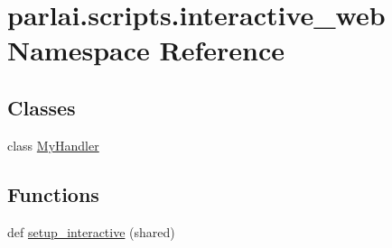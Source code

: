 \hypertarget{namespaceparlai_1_1scripts_1_1interactive__web}{}\section{parlai.\+scripts.\+interactive\+\_\+web Namespace Reference}
\label{namespaceparlai_1_1scripts_1_1interactive__web}
\subsection*{Classes}
\begin{DoxyCompactItemize}
\item 
class \hyperlink{classparlai_1_1scripts_1_1interactive__web_1_1MyHandler}{My\+Handler}
\end{DoxyCompactItemize}
\subsection*{Functions}
\begin{DoxyCompactItemize}
\item 
def \hyperlink{namespaceparlai_1_1scripts_1_1interactive__web_abeab09cab4f9e60077ffd5050bff36ef}{setup\+\_\+interactive} (shared)
\end{DoxyCompactItemize}
